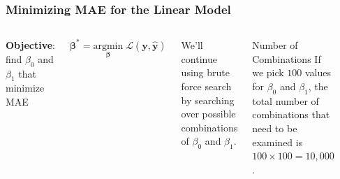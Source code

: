 \documentclass{beamer}
\begin{document}
\begin{frame}
\frametitle{Minimizing MAE for the Linear Model}

\begin{columns}

\textbf{Objective}: find $\beta_0$ and $\beta_1$ that minimize MAE

\[
\boldsymbol{\beta}^{*}=\underset{\boldsymbol{\beta}}{\textrm{argmin}}\;\mathcal{L}(\mathbf{y},\hat{\mathbf{y}})
\]

We'll continue using brute force search by searching over possible combinations of $\beta_0$ and $\beta_1$.


\begin{block}{Number of Combinations} 
If we pick $100$ values for $\beta_0$ and $\beta_1$, the total number of combinations that need to be examined is $100 \times 100 = 10,000$.
\end{block}



\begin{figure}
\includegraphics[width=\textwidth]{../figures/loss_demo_line.png}
\end{figure}

\end{columns}

\end{frame}
\end{document}
